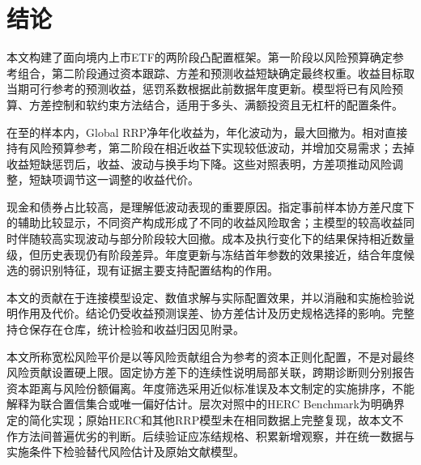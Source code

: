 \section{结论}
本文构建了面向境内上市ETF的两阶段凸配置框架。第一阶段以风险预算确定参考组合，第二阶段通过资本跟踪、方差和预测收益短缺确定最终权重。收益目标取当期可行参考的预测收益，惩罚系数根据此前数据年度更新。模型将已有风险预算、方差控制和软约束方法结合，适用于多头、满额投资且无杠杆的配置条件。

在\evalStartDate{}至\evalEndDate{}的样本内，Global RRP净年化收益为\globalNetReturn，年化波动为\globalVolatility，最大回撤为\globalMaxDD。相对直接持有风险预算参考，第二阶段在相近收益下实现较低波动，并增加交易需求；去掉收益短缺惩罚后，收益、波动与换手均下降。这些对照表明，方差项推动风险调整，短缺项调节这一调整的收益代价。

现金和债券占比较高，是理解低波动表现的重要原因。指定事前样本协方差尺度下的辅助比较显示，不同资产构成形成了不同的收益风险取舍；主模型的较高收益同时伴随较高实现波动与部分阶段较大回撤。成本及执行变化下的结果保持相近数量级，但历史表现仍有阶段差异。年度更新与冻结首年参数的效果接近，结合年度候选的弱识别特征，现有证据主要支持配置结构的作用。

本文的贡献在于连接模型设定、数值求解与实际配置效果，并以消融和实施检验说明作用及代价。结论仍受收益预测误差、协方差估计及历史规格选择的影响。完整持仓保存在仓库，统计检验和收益归因见附录。

本文所称宽松风险平价是以等风险贡献组合为参考的资本正则化配置，不是对最终风险贡献设置硬上限。固定协方差下的连续性说明局部关联，跨期诊断则分别报告资本距离与风险份额偏离。年度筛选采用近似标准误及本文制定的实施排序，不能解释为联合置信集合或唯一偏好估计。层次对照中的HERC Benchmark为明确界定的简化实现；原始HERC和其他RRP模型未在相同数据上完整复现，故本文不作方法间普遍优劣的判断。后续验证应冻结规格、积累新增观察，并在统一数据与实施条件下检验替代风险估计及原始文献模型。

